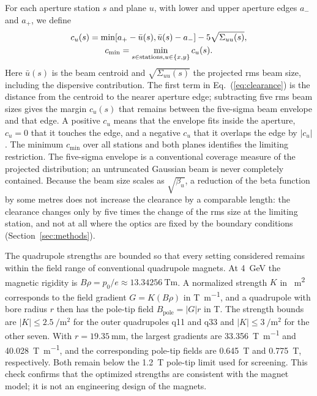 \documentclass[final,5p,twocolumn]{elsarticle}
\newcommand{\BtsEquationPair}[2]{%
\ifdefined\BtsTwoColumn\begin{gathered}#1\\#2\end{gathered}%
\else#1\qquad#2\fi}
\begin{document}
For each aperture station $s$ and plane $u$, with lower and upper aperture edges
$a_-$ and $a_+$, we define
\begin{equation}
 \BtsEquationPair{c_u(s)=\min[a_+-\bar u(s),\bar u(s)-a_-]-5\sqrt{\Sigma_{uu}(s)},}
 {c_{\min}=\min_{s\in\mathrm{stations},u\in\{x,y\}}c_u(s).}
 \label{eq:clearance}
\end{equation}
Here $\bar u(s)$ is the beam centroid and $\sqrt{\Sigma_{uu}(s)}$ the projected rms
beam size, including the dispersive contribution. The first term in
Eq.~(\ref{eq:clearance}) is the distance from the centroid to the nearer aperture
edge; subtracting five rms beam sizes gives the margin $c_u(s)$ that remains between
the five-sigma beam envelope and that edge. A positive $c_u$ means that the envelope
fits inside the aperture, $c_u=0$ that it touches the edge, and a negative $c_u$ that
it overlaps the edge by $|c_u|$. The minimum $c_{\min}$ over all stations and both
planes identifies the limiting restriction. The five-sigma envelope is a conventional
coverage measure of the projected distribution; an untruncated Gaussian beam is
never completely contained. Because the beam size scales as $\sqrt{\beta_u}$, a
reduction of the beta function by some metres does not increase the clearance by a
comparable length: the clearance changes only by five times the change of the rms
size at the limiting station, and not at all where the optics are fixed by the
boundary conditions (Section~\ref{sec:methods}).

The quadrupole strengths are bounded so that every setting considered remains
within the field range of conventional quadrupole magnets. At
\SI{4}{\giga\electronvolt} the magnetic rigidity is
$B\rho=p_0/e\approx\SI{13.34256}{\tesla\metre}$. A normalized strength $K$ in
\si{\per\square\metre} corresponds to the field gradient $G=K(B\rho)$ in
\si{\tesla\per\metre}, and a quadrupole with bore radius $r$ then has the pole-tip
field $B_{\mathrm{pole}}=|G|r$ in \si{\tesla}. The strength bounds are
$|K|\le\SI{2.5}{\per\square\metre}$ for the outer quadrupoles q11 and q33 and
$|K|\le\SI{3}{\per\square\metre}$ for the other seven. With
$r=\SI{19.35}{\milli\metre}$, the largest gradients are \SI{33.356}{\tesla\per\metre}
and \SI{40.028}{\tesla\per\metre}, and the corresponding pole-tip fields are
\SI{0.645}{\tesla} and \SI{0.775}{\tesla}, respectively. Both remain below the
\SI{1.2}{\tesla} pole-tip limit used for screening. This check confirms that the
optimized strengths are consistent with the magnet model; it is not an engineering
design of the magnets.
\end{document}
